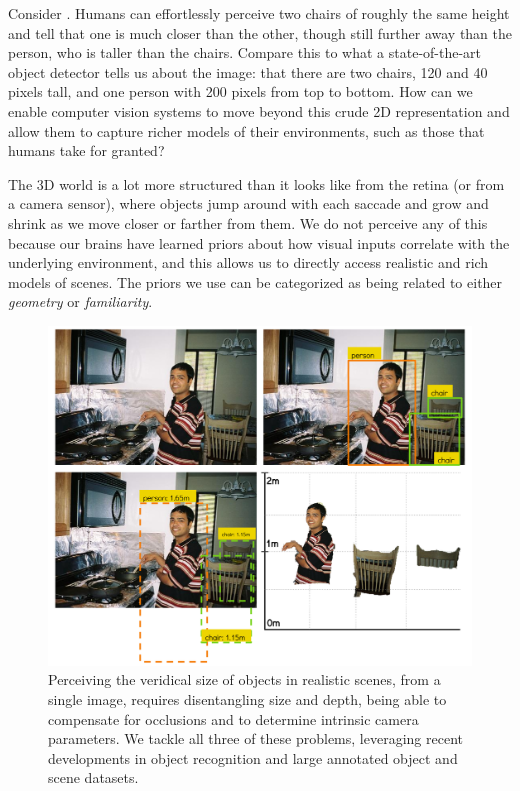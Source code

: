 Consider . Humans can effortlessly perceive two chairs of roughly the same height and tell that one is much closer than the other, though still further away than the person, who is taller than the chairs. Compare this to what a state-of-the-art object detector tells us about the image: that there are two chairs, 120 and 40 pixels tall, and one person with 200 pixels from top to bottom. How can we enable computer vision systems to move beyond this crude 2D representation and allow them to capture richer models of their environments, such as those that humans take for granted?

The 3D world is a lot more structured than it looks like from the retina (or from a camera sensor), where objects jump around with each saccade and grow and shrink as we move closer or farther from them. We do not perceive any of this because our brains have learned priors about how visual inputs correlate with the underlying environment, and this allows us to directly access realistic and rich models of scenes. The priors we use can be categorized as being related to either \textit{geometry} or \textit{familiarity}.

\begin{figure}[t!]
  \centering
  \includegraphics[width=.9\textwidth]{figures/amodal/Fig_1.png} %
  \caption{ Perceiving the veridical size of objects in realistic scenes, from a single image, requires disentangling size and depth, being able to compensate for occlusions and to determine intrinsic camera parameters. We tackle all three of these problems, leveraging recent developments in object recognition and large annotated object and scene datasets.}
\end{figure}

